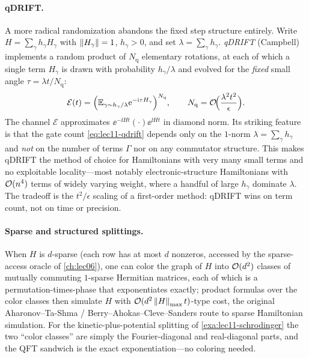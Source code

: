 \paragraph{qDRIFT.}
A more radical randomization abandons the fixed step structure entirely. Write
$H=\sum_\gamma h_\gamma H_\gamma$ with $\left\lVert H_\gamma \right\rVert=1$, $h_\gamma>0$, and set
$\lambda=\sum_\gamma h_\gamma$. \emph{qDRIFT} (Campbell) implements a random product of
$N_{\mathrm{q}}$ elementary rotations, at each of which a single term $H_\gamma$ is drawn
with probability $h_\gamma/\lambda$ and evolved for the \emph{fixed} small angle
$\tau=\lambda t/N_{\mathrm{q}}$:
\begin{equation}
  \mathcal E(t)=\Bigl(\mathbb{E}_{\gamma\sim h_\gamma/\lambda}
     \mathrm{e}^{-\mathrm{i}\tau H_\gamma}\Bigr)^{N_{\mathrm q}},\qquad
  N_{\mathrm q}=\mathcal{O}\!\Bigl(\frac{\lambda^2 t^2}{\epsilon}\Bigr).
  \label{eq:lec11-qdrift}
\end{equation}
The channel $\mathcal E$ approximates $\ee^{-\ii Ht}(\cdot)\ee^{\ii Ht}$ in diamond norm.
Its striking feature is that the gate count \eqref{eq:lec11-qdrift} depends only on the
$1$-norm $\lambda=\sum_\gamma h_\gamma$ and \emph{not} on the number of terms $\Gamma$ nor
on any commutator structure. This makes qDRIFT the method of choice for Hamiltonians with
very many small terms and no exploitable locality---most notably electronic-structure
Hamiltonians with $\mathcal{O}(n^4)$ terms of widely varying weight, where a handful of large
$h_\gamma$ dominate $\lambda$. The tradeoff is the $t^2/\epsilon$ scaling of a
first-order method: qDRIFT wins on term count, not on time or precision.

\paragraph{Sparse and structured splittings.}
When $H$ is $d$-sparse (each row has at most $d$ nonzeros, accessed by the sparse-access
oracle of \cref{ch:lec06}), one can color the graph of $H$ into $\mathcal{O}(d^2)$ classes of
mutually commuting $1$-sparse Hermitian matrices, each of which is a permutation-times-phase
that exponentiates exactly; product formulas over the color classes then simulate $H$ with
$\mathcal{O}(d^2\left\lVert H \right\rVert_{\max}t)$-type cost, the original Aharonov--Ta-Shma / Berry--Ahokas--Cleve--Sanders
route to sparse Hamiltonian simulation. For the kinetic-plus-potential splitting of
\cref{exa:lec11-schrodinger} the two ``color classes'' are simply the Fourier-diagonal and
real-diagonal parts, and the QFT sandwich is the exact exponentiation---no coloring needed.

